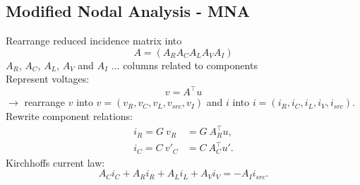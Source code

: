%			

	\subsection{Modified Nodal Analysis - MNA}
	\begin{frame}
		Rearrange reduced incidence matrix into
		\begin{displaymath}
			A = (A_R A_C A_L A_V A_I)
		\end{displaymath}
		$A_R$, $A_C$, $A_L$, $A_V$ and $A_I$ ... columns related to components\\
		Represent voltages:
		\begin{displaymath}
			v = A^\top u
		\end{displaymath}
		$\to$ rearrange $v$ into $v = (v_R, v_C, v_L, v_{src}, v_I)$ and $i$ into $i = (i_R, i_C, i_L, i_V, i_{src})$. 
		Rewrite component relations:
		\begin{align*}
			i_R = G \ v_R &= G \ A_R^\top u, \\
			i_C = C \ v'_C &= C \ A_C^\top u'.
		\end{align*}
		Kirchhoffs current law:
		\begin{displaymath}
			A_C i_C + A_R i_R + A_L i_L + A_V i_V = -A_I i_{src}.
		\end{displaymath}

	\end{frame}

